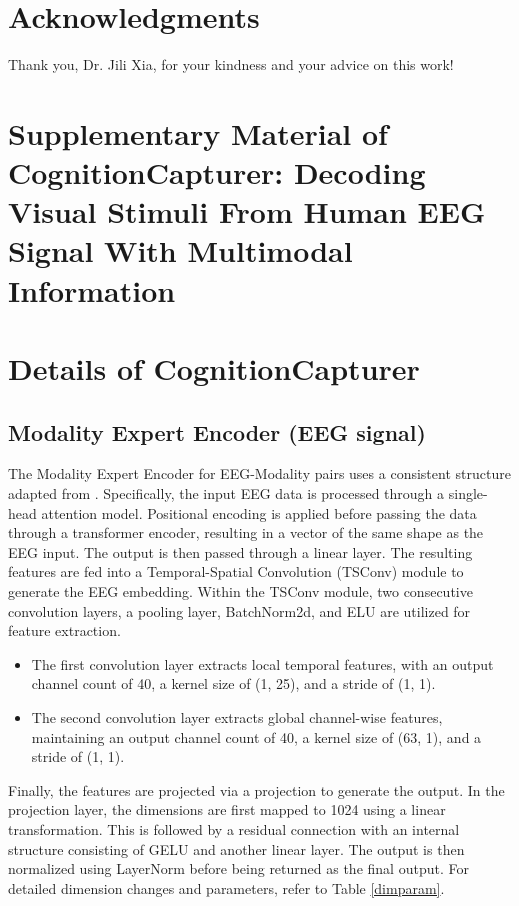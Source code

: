 \documentclass[letterpaper]{article} %
\begin{document}
\section{Acknowledgments}

Thank you, Dr. Jili Xia, for your kindness and your advice on this work!

\begingroup
\small

\endgroup

\newpage

\section{Supplementary Material of CognitionCapturer: Decoding Visual Stimuli From Human EEG Signal With Multimodal Information}

\section{Details of CognitionCapturer}

\subsection{Modality Expert Encoder (EEG signal)}

The Modality Expert Encoder for EEG-Modality pairs uses a consistent structure adapted from \cite{li2024visualdecodingreconstructioneeg}. Specifically, the input EEG data is processed through a single-head attention model. Positional encoding is applied before passing the data through a transformer encoder, resulting in a vector of the same shape as the EEG input. The output is then passed through a linear layer. The resulting features are fed into a Temporal-Spatial Convolution (TSConv) module to generate the EEG embedding. Within the TSConv module, two consecutive convolution layers, a pooling layer, BatchNorm2d, and ELU are utilized for feature extraction.

\begin{itemize}
\item The first convolution layer extracts local temporal features, with an output channel count of 40, a kernel size of (1, 25), and a stride of (1, 1).
\item The second convolution layer extracts global channel-wise features, maintaining an output channel count of 40, a kernel size of (63, 1), and a stride of (1, 1).
\end{itemize}

Finally, the features are projected via a projection to generate the output. In the projection layer, the dimensions are first mapped to 1024 using a linear transformation. This is followed by a residual connection with an internal structure consisting of GELU and another linear layer. The output is then normalized using LayerNorm before being returned as the final output. For detailed dimension changes and parameters, refer to Table \ref{dimparam}.
\end{document}
